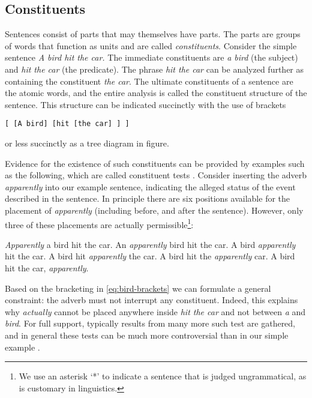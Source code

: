 \subsection{Constituents}
Sentences consist of parts that may themselves have parts. The parts are groups of words that function as units and are called \textit{constituents}. Consider the simple sentence \textit{A bird hit the car.} The immediate constituents are \textit{a bird} (the subject) and \textit{hit the car} (the predicate). The phrase \textit{hit the car} can be analyzed further as containing the constituent \textit{the car}. The ultimate constituents of a sentence are the atomic words, and the entire analysis is called the constituent structure of the sentence. This structure can be indicated succinctly with the use of brackets
\begin{exe}
  \ex \verb![ [A bird] [hit [the car] ] ]!
\end{exe}
or less succinctly as a tree diagram in figure.
\begin{figure}[h]{\textwidth}
  \center
  \label{fig:bird-tree}
\end{figure}
Evidence for the existence of such constituents can be provided by examples such as the following, which are called constituent tests \citep{carnie2010constituent}. Consider inserting the adverb \textit{apparently} into our example sentence, indicating the alleged status of the event described in the sentence. In principle there are six positions available for the placement of \textit{apparently} (including before, and after the sentence). However, only three of these placements are actually permissible\footnote{We use an asterisk `*' to indicate a sentence that is judged ungrammatical, as is customary in linguistics.}:
\begin{exe}
  \ex \begin{xlist}
    \ex \textit{Apparently} a bird hit the car.
    \ex *An \textit{apparently} bird hit the car.
    \ex A bird \textit{apparently} hit the car.
    \ex *A bird hit \textit{apparently} the car.
    \ex *A bird hit the \textit{apparently} car.
    \ex A bird hit the car, \textit{apparently}.
  \end{xlist}
\end{exe}
Based on the bracketing in \ref{eq:bird-brackets} we can formulate a general constraint: the adverb must not interrupt any constituent. Indeed, this explains why \textit{actually} cannot be placed anywhere inside \textit{hit the car} and not between \textit{a} and \textit{bird}. For full support, typically results from many more such test are gathered, and in general these tests can be much more controversial than in our simple example \citep{carnie2010constituent}.

